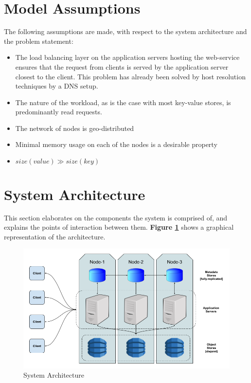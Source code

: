 \documentclass{sig-alternate}
\begin{document}
\section{Model Assumptions}
The following assumptions are made, with respect to the system architecture and the problem statement:
\begin{itemize}
	\item The load balancing layer on the application servers hosting the web-service ensures that the request from clients is served by the application server closest to the client. This problem has already been solved by host resolution techniques by a DNS setup\cite{pan2003overview}.
	\item The nature of the workload, as is the case with most key-value stores, is predominantly read requests.
	\item The network of nodes is geo-distributed
	\item Minimal memory usage on each of the nodes is a desirable property
	\item $\displaystyle size(value) \gg size(key)$
\end{itemize}


\section{System Architecture}
This section elaborates on the components the system is comprised of, and explains the points of interaction between them. \textbf{Figure \ref{fig:sysarch}} shows a graphical representation of the architecture.\\

\begin{figure}
\centering
\includegraphics[width=\textwidth]{images/SystemArchitecture.png}
\caption{System Architecture}
\label{fig:sysarch}
\end{figure}
\end{document}
